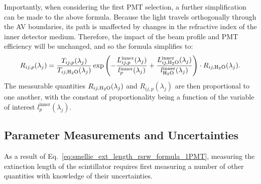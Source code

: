 Importantly, when considering the first PMT selection, a further simplification can be made to the above formula. Because the light travels orthogonally through the AV boundaries, its path is unaffected by changes in the refractive index of the inner detector medium. Therefore, the impact of the beam profile and PMT efficiency will be unchanged, and so the formula simplifies to:
\begin{equation}\label{eq:smellie_ext_length_rsrw_formula_1PMT}
    R_{ij,p}(\lambda_{j}) = 
    \frac{T_{ij,p}(\lambda_{j})}{T_{ij,\ce{H_{2}O}}(\lambda_{j})}
    \exp\left(
        -\frac{L_{ij,p}^{\mathrm{inner}}(\lambda_{j})}{l_{p}^{\mathrm{inner}}(\lambda_{j})}
        +\frac{L_{ij,\ce{H_{2}O}}^{\mathrm{inner}}(\lambda_{j})}{l_{\ce{H_{2}O}}^{\mathrm{inner}}(\lambda_{j})}
    \right)
    \cdot R_{ij,\ce{H_{2}O}}(\lambda_{j}).
\end{equation}
The measurable quantities $R_{ij,\ce{H_{2}O}}(\lambda_{j})$ and $R_{ij,p}(\lambda_{j})$ are then proportional to one another, with the constant of proportionality being a function of the variable of interest $l_{p}^{\mathrm{inner}}(\lambda_{j})$.


\subsection{Parameter Measurements and Uncertainties}
As a result of Eq.~\ref{eq:smellie_ext_length_rsrw_formula_1PMT}, measuring the extinction length of the scintillator requires first measuring a number of other quantities with knowledge of their uncertainties.

